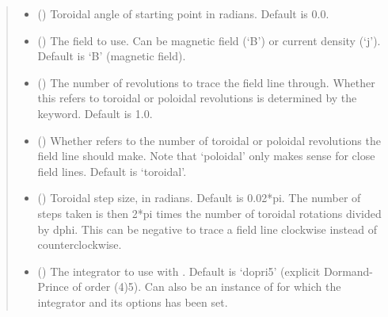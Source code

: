 \documentclass[letterpaper,10pt,english]{sphinxmanual}
\begin{document}
\begin{fulllineitems}
\begin{fulllineitems}
\begin{quote}
\begin{description}
\begin{itemize}
\item {} 
 () \textendash{} Toroidal angle of starting point in radians. Default
is 0.0.

\item {} 
 (\sphinxstyleliteralemphasis{\sphinxupquote{, }}) \textendash{} The field to use. Can be magnetic field (‘B’) or
current density (‘j’). Default is ‘B’ (magnetic field).

\item {} 
 () \textendash{} The number of revolutions to trace the field line
through. Whether this refers to toroidal or poloidal revolutions
is determined by the  keyword. Default is 1.0.

\item {} 
 (\sphinxstyleliteralemphasis{\sphinxupquote{, }}) \textendash{} Whether  refers to the
number of toroidal or poloidal revolutions the field line should
make. Note that ‘poloidal’ only makes sense for close field
lines. Default is ‘toroidal’.

\item {} 
 () \textendash{} Toroidal step size, in radians. Default is 0.02*pi.
The number of steps taken is then 2*pi times the number of
toroidal rotations divided by dphi. This can be negative to
trace a field line clockwise instead of counterclockwise.

\item {} 
 () \textendash{} The integrator to use with
. Default is ‘dopri5’ (explicit
Dormand-Prince of order (4)5). Can also be an instance of
 for which the integrator and its
options has been set.

\end{itemize}


\end{description}
\end{quote}
\end{fulllineitems}
\end{fulllineitems}
\end{document}
